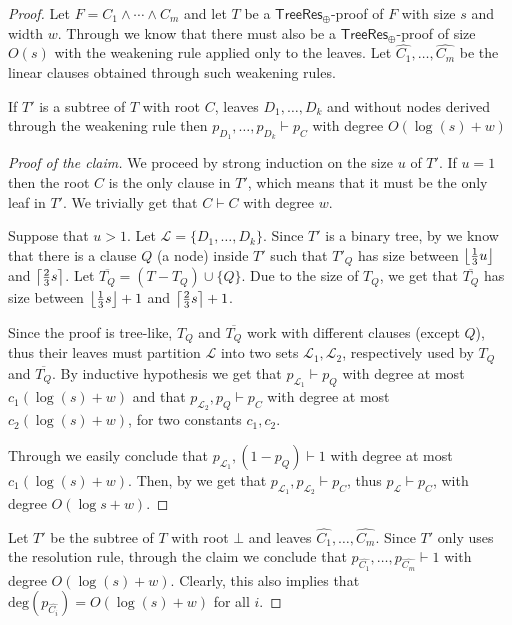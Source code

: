 \begin{proof}
 Let $F = C_1 \land \cdots \land C_m$ and let $T$ be a $\mathsf{TreeRes}_\oplus$-proof of $F$ with size $s$ and width $w$. Through  we know that there must also be a $\mathsf{TreeRes}_\oplus$-proof of size $O(s)$ with the weakening rule applied only to the leaves. Let $\widehat{C_1}, \ldots, \widehat{C_m}$ be the linear clauses obtained through such weakening rules.
    
    \begin{claim}
 If $T'$ is a subtree of $T$ with root $C$, leaves $D_1, \ldots, D_k$ and without nodes derived through the weakening rule then $p_{D_1}, \ldots, p_{D_k} \vdash p_C$ with degree $O(\log (s) + w)$
    \end{claim}

    \begin{proof}[Proof of the claim]
 We proceed by strong induction on the size $u$ of $T'$. If $u = 1$ then the root $C$ is the only clause in $T'$, which means that it must be the only leaf in $T'$. We trivially get that $C \vdash C$ with degree $w$.
        
 Suppose that $u > 1$. Let $\mathcal{L} = \{D_1, \ldots, D_k\}$. Since $T'$ is a binary tree, by  we know that there is a clause $Q$ (a node) inside $T'$ such that $T'_{Q}$ has size between $\left \lfloor \frac{1}{3} u \right \rfloor$ and $\left \lceil \frac{2}{3} s \right \rceil$. Let $\overline{T_Q} = (T - T_{Q}) \cup \{Q\}$. Due to the size of $T_{Q}$, we get that $\overline{T_{Q}}$ has size between $\left \lfloor \frac{1}{3} s \right \rfloor+1$ and $\left \lceil \frac{2}{3} s \right \rceil+1$. 
    
 Since the proof is tree-like, $T_{Q}$ and $\overline{T_Q}$ work with different clauses (except $Q$), thus their leaves must partition $\mathcal{L}$ into two sets $\mathcal{L}_1, \mathcal{L}_2$, respectively used by $T_{Q}$ and $\overline{T_Q}$. By inductive hypothesis we get that $p_{\mathcal{L}_1} \vdash p_Q$ with degree at most $c_1(\log(s) + w)$ and that $p_{\mathcal{L}_2}, p_Q \vdash p_C$ with degree at most $c_2(\log(s) + w)$, for two constants $c_1, c_2$.
        
 Through  we easily conclude that $p_{\mathcal{L}_1}, (1-p_{Q})\vdash 1$ with degree at most $c_1(\log(s) + w)$. Then, by  we get that $p_{\mathcal{L}_1}, p_{\mathcal{L}_2} \vdash p_C$, thus $p_\mathcal{L} \vdash p_C$, with degree $O(\log s + w)$.
    \end{proof}

 Let $T'$ be the subtree of $T$ with root $\bot$ and leaves $\widehat{C_1}, \ldots, \widehat{C_m}$. Since $T'$ only uses the resolution rule, through the claim we conclude that $p_{\widehat{C_1}}, \ldots, p_{\widehat{C_m}} \vdash 1$ with degree $O(\log(s)+w)$. Clearly, this also implies that $\mathrm{deg}(p_{\widehat{C_i}}) = O(\log(s)+w)$ for all $i$.
    

\end{proof}
